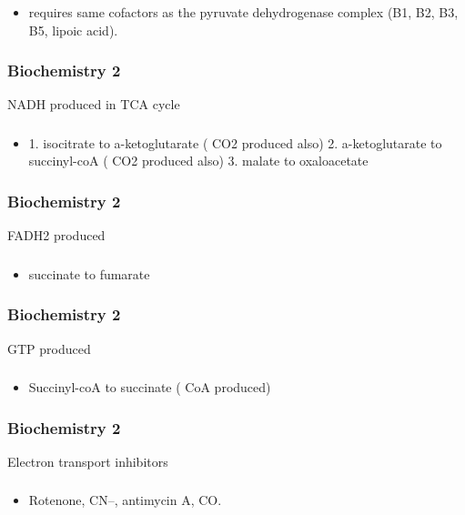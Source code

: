 \documentclass[11pt]{beamer}
\begin{document}
\begin{frame}
 \frametitle{}
\begin{itemize}
\item requires same cofactors as the pyruvate dehydrogenase complex (B1, B2, B3, B5, lipoic acid).
\end{itemize}
\end{frame}

\begin{frame}
 \frametitle{Biochemistry 2}
NADH produced in TCA cycle 
\end{frame}

\begin{frame}
 \frametitle{}
\begin{itemize}
\item 1. isocitrate to a-ketoglutarate ( CO2 produced also) 2. a-ketoglutarate to succinyl-coA ( CO2 produced also) 3. malate to oxaloacetate 
\end{itemize}
\end{frame}

\begin{frame}
 \frametitle{Biochemistry 2}
FADH2 produced 
\end{frame}

\begin{frame}
 \frametitle{}
\begin{itemize}
\item succinate to fumarate
\end{itemize}
\end{frame}

\begin{frame}
 \frametitle{Biochemistry 2}
GTP produced 
\end{frame}

\begin{frame}
 \frametitle{}
\begin{itemize}
\item Succinyl-coA to succinate  ( CoA produced) 
\end{itemize}
\end{frame}

\begin{frame}
 \frametitle{Biochemistry 2}
Electron transport inhibitors
\end{frame}

\begin{frame}
 \frametitle{}
\begin{itemize}
\item Rotenone, CN–, antimycin A, CO.
\end{itemize}
\end{frame}
\end{document}
